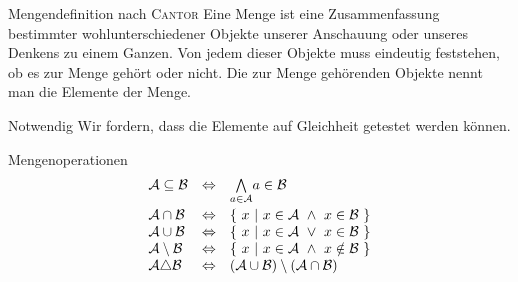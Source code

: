 \documentclass[]{beamer}
\begin{document}
\begin{frame}[<+->][squeeze]{}
  \begin{block}{Mengendefinition nach \textsc{Cantor}}
    Eine Menge ist eine Zusammenfassung bestimmter wohlunterschiedener
    Objekte unserer Anschauung oder unseres Denkens zu einem Ganzen. Von jedem
    dieser Objekte muss eindeutig feststehen, ob es zur Menge gehört oder nicht.
    Die zur Menge gehörenden Objekte nennt man die Elemente der Menge.
  \end{block}
  
  \begin{alertblock}{Notwendig}
    Wir fordern, dass die Elemente auf Gleichheit getestet werden können.
  \end{alertblock}  
  
  \begin{block}{Mengenoperationen}
    \[\begin{array}{l c l}
        \mathcal{A} \subseteq \mathcal{B} & \Leftrightarrow & \underset{a \in \mathcal{A}}{\bigwedge} a \in \mathcal{B} \vspace*{0.25em}\\
        \mathcal{A} \cap      \mathcal{B} & \Leftrightarrow & \{ \ x \ | \ x \in \mathcal{A} \ \land \ x \in    \mathcal{B} \ \} \\
        \mathcal{A} \cup      \mathcal{B} & \Leftrightarrow & \{ \ x \ | \ x \in \mathcal{A} \ \vee   \ x \in    \mathcal{B} \ \} \\
        \mathcal{A} \setminus \mathcal{B} & \Leftrightarrow & \{ \ x \ | \ x \in \mathcal{A} \ \land \ x \notin \mathcal{B} \ \} \\
        \mathcal{A} \triangle \mathcal{B} & \Leftrightarrow & \left( \mathcal{A} \cup \mathcal{B} \right) \setminus \left( \mathcal{A} \cap \mathcal{B} \right) \\
      \end{array}\]
  \end{block}
\end{frame}
\end{document}
